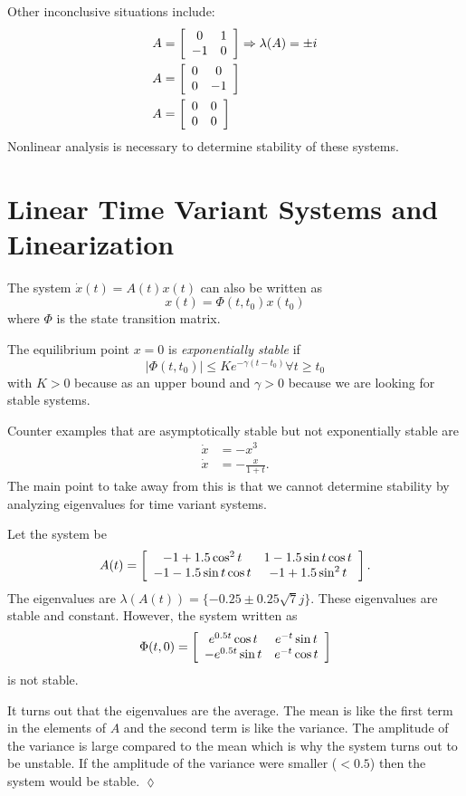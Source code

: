 Other inconclusive situations include:
\begin{align*}
A &= \left[\begin{array}{c c} 0 & 1 \\ -1 & 0 \end{array}\right] \Rightarrow \lambda(A)=\pm i \\
A &= \left[\begin{array}{c c} 0 & 0 \\ 0 & -1 \end{array}\right] \\
A &= \left[\begin{array}{c c} 0 & 0 \\ 0 & 0 \end{array}\right]
\end{align*}
Nonlinear analysis is necessary to determine stability of these systems.

\section{Linear Time Variant Systems and Linearization}
The system $\dot{x}(t) = A(t)x(t)$ can also be written as
$$x(t) = \Phi(t,t_0)x(t_0)$$
where $\Phi$ is the state transition matrix.

\begin{definition}
The equilibrium point $x=0$ is \textit{exponentially stable} if
$$|\Phi(t,t_0)| \leq Ke^{-\gamma(t-t_0)} \forall t\geq t_0$$
with $K>0$ because as an upper bound and $\gamma>0$ because we are looking for stable systems.
\end{definition}

Counter examples that are asymptotically stable but not exponentially stable are
\begin{align*}
\dot{x} &= -x^3 \\
\dot{x} &= -\frac{x}{1+t}.
\end{align*}
The main point to take away from this is that we cannot determine stability by analyzing eigenvalues for time variant systems.

\begin{example}
Let the system be
$$A(t) = \left[\begin{array}{c c} -1+1.5\cos^2t & 1-1.5\sin t\cos t \\ -1-1.5\sin t\cos t & -1+1.5\sin^2t \end{array}\right].$$
The eigenvalues are $\lambda(A(t)) = \{-0.25\pm 0.25\sqrt{7}j\}$. These eigenvalues are stable and constant. However, the system written as
$$\Phi(t,0) = \left[\begin{array}{c c} e^{0.5t}\cos t & e^{-t}\sin t \\ -e^{0.5t}\sin t & e^{-t}\cos t \end{array}\right]$$
is not stable.

It turns out that the eigenvalues are the average. The mean is like the first term in the elements of $A$ and the second term is like the variance. The amplitude of the variance is large compared to the mean which is why the system turns out to be unstable. If the amplitude of the variance were smaller ($<0.5$) then the system would be stable.
$\lozenge$
\end{example}

